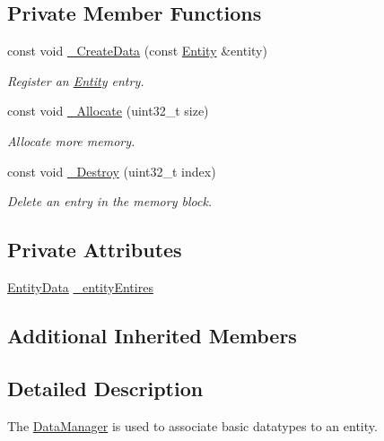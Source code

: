 \subsection*{Private Member Functions}
\begin{DoxyCompactItemize}
\item 
const void \hyperlink{class_m_p_e_1_1_data_manager_ad164b9613a36a5bbb70bb8aac700416a}{\+\_\+\+Create\+Data} (const \hyperlink{struct_m_p_e_1_1_entity}{Entity} \&entity)
\begin{DoxyCompactList}\small\item\em Register an \hyperlink{struct_m_p_e_1_1_entity}{Entity} entry. \end{DoxyCompactList}\item 
const void \hyperlink{class_m_p_e_1_1_data_manager_acfb97e38f7c66cb59769835554c43e82}{\+\_\+\+Allocate} (uint32\+\_\+t size)
\begin{DoxyCompactList}\small\item\em Allocate more memory. \end{DoxyCompactList}\item 
const void \hyperlink{class_m_p_e_1_1_data_manager_aac128f82ae3d0e37ce8afc46f493dc4b}{\+\_\+\+Destroy} (uint32\+\_\+t index)
\begin{DoxyCompactList}\small\item\em Delete an entry in the memory block. \end{DoxyCompactList}\end{DoxyCompactItemize}
\subsection*{Private Attributes}
\begin{DoxyCompactItemize}
\item 
\hyperlink{struct_m_p_e_1_1_data_manager_1_1_entity_data}{Entity\+Data} \hyperlink{class_m_p_e_1_1_data_manager_a7c31d54443c2ff3dc77e2bf392de09ef}{\+\_\+entity\+Entires}
\end{DoxyCompactItemize}
\subsection*{Additional Inherited Members}


\subsection{Detailed Description}
The \hyperlink{class_m_p_e_1_1_data_manager}{Data\+Manager} is used to associate basic datatypes to an entity. 

